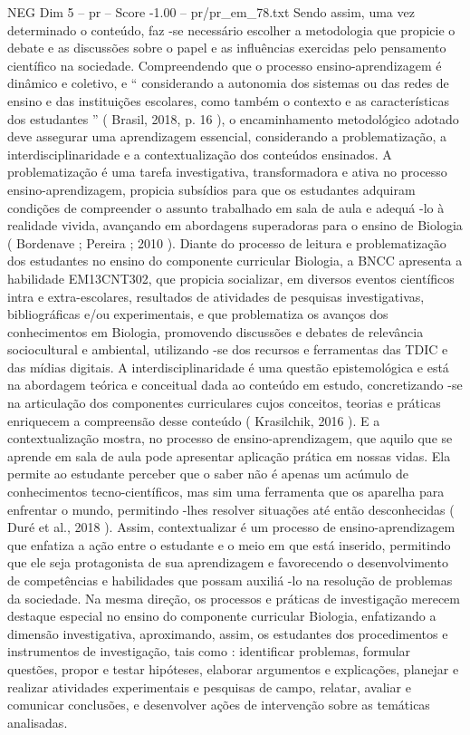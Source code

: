\begin{textsample}{NEG Dim 5 – pr – Score -1.00 – pr/pr\_em\_78.txt}
Sendo assim, uma vez determinado o conteúdo, faz -se necessário escolher a metodologia que propicie o debate e as discussões sobre o papel e as influências exercidas pelo pensamento científico na sociedade.
Compreendendo que o processo ensino-aprendizagem é dinâmico e coletivo, e “ considerando a autonomia dos sistemas ou das redes de ensino e das instituições escolares, como também o contexto e as características dos estudantes ” ( Brasil, 2018, p. 16 ), o encaminhamento metodológico adotado deve assegurar uma aprendizagem essencial, considerando a problematização, a interdisciplinaridade e a contextualização dos conteúdos ensinados.
A problematização é uma tarefa investigativa, transformadora e ativa no processo ensino-aprendizagem, propicia subsídios para que os estudantes adquiram condições de compreender o assunto trabalhado em sala de aula e adequá -lo à realidade vivida, avançando em abordagens superadoras para o ensino de Biologia ( Bordenave ; Pereira ; 2010 ).
Diante do processo de leitura e problematização dos estudantes no ensino do componente curricular Biologia, a BNCC apresenta a habilidade EM13CNT302, que propicia socializar, em diversos eventos científicos intra e extra-escolares, resultados de atividades de pesquisas investigativas, bibliográficas e/ou experimentais, e que problematiza os avanços dos conhecimentos em Biologia, promovendo discussões e debates de relevância sociocultural e ambiental, utilizando -se dos recursos e ferramentas das TDIC e das mídias digitais.
A interdisciplinaridade é uma questão epistemológica e está na abordagem teórica e conceitual dada ao conteúdo em estudo, concretizando -se na articulação dos componentes curriculares cujos conceitos, teorias e práticas enriquecem a compreensão desse conteúdo ( Krasilchik, 2016 ).
E a contextualização mostra, no processo de ensino-aprendizagem, que aquilo que se aprende em sala de aula pode apresentar aplicação prática em nossas vidas.
Ela permite ao estudante perceber que o saber não é apenas um acúmulo de conhecimentos tecno-científicos, mas sim uma ferramenta que os aparelha para enfrentar o mundo, permitindo -lhes resolver situações até então desconhecidas ( Duré et al., 2018 ).
Assim, contextualizar é um processo de ensino-aprendizagem que enfatiza a ação entre o estudante e o meio em que está inserido, permitindo que ele seja protagonista de sua aprendizagem e favorecendo o desenvolvimento de competências e habilidades que possam auxiliá -lo na resolução de problemas da sociedade.
Na mesma direção, os processos e práticas de investigação merecem destaque especial no ensino do componente curricular Biologia, enfatizando a dimensão investigativa, aproximando, assim, os estudantes dos procedimentos e instrumentos de investigação, tais como : identificar problemas, formular questões, propor e testar hipóteses, elaborar argumentos e explicações, planejar e realizar atividades experimentais e pesquisas de campo, relatar, avaliar e comunicar conclusões, e desenvolver ações de intervenção sobre as temáticas analisadas.

\end{textsample}
